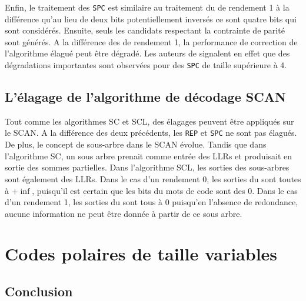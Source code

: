 Enfin, le traitement des \noeuds \texttt{SPC} est similaire au traitement du \noeud de rendement 1 à la différence qu'au lieu de deux bits potentiellement inversés ce sont quatre bits qui sont considérés. Ensuite, seuls les candidats respectant la contrainte de parité sont générés. A la différence des \noeuds de rendement 1, la performance de correction de l'algorithme élagué peut être dégradé. Les auteurs de \cite{sarkis_fast_2016} signalent en effet que des dégradations importantes sont observées pour des \noeuds \texttt{SPC} de taille supérieure à 4. 


\subsection{L'élagage de l'algorithme de décodage SCAN}
Tout comme les algorithmes SC et SCL, des élagages peuvent être appliqués sur le SCAN. A la différence des deux précédents, les \noeuds \texttt{REP} et \texttt{SPC} ne sont pas élagués. De plus, le concept de sous-arbre dans le SCAN évolue. Tandis que dans l'algorithme SC, un sous arbre prenait comme entrée des LLRs et produisait en sortie des sommes partielles. Dans l'algorithme SCL, les sorties des sous-arbres sont également des LLRs. Dans le cas d'un rendement 0, les sorties du \noeud sont toutes à $+\inf$, puisqu'il est certain que les bits du mots de code sont des $0$. Dans le cas d'un rendement 1, les sorties du \noeud sont tous à $0$ puisqu'en l'absence de redondance, aucune information ne peut être donnée à partir de ce sous arbre.

\section{Codes polaires de taille variables}


\subsection*{Conclusion}
{}